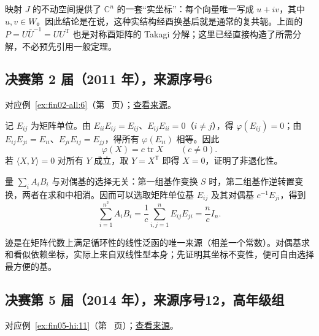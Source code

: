 \documentclass[UTF8,12pt,a4paper,fontset=fandol]{ctexart}
\begin{document}
\begin{remark}[方法与条件]

映射 $J$ 的不动空间提供了 $\mathbb C^n$ 的一套“实坐标”：每个向量唯一写成 $u+iv$，其中 $u,v\in W$。因此结论是在说，这种实结构经酉换基后就是通常的复共轭。上面的 $P=U\bar U^{-1}=UU^{\mathrm T}$ 也是对称酉矩阵的 Takagi 分解；这里已经直接构造了所需分解，不必预先引用一般定理。

\end{remark}

\subsection{决赛第 2 届（2011 年），来源序号6}\label{ans:fin02-all:6}\label{pr:fin02-all:6}

对应例~\ref{ex:fin02-all:6}（第~\pageref{ex:fin02-all:6} 页）；\href{https://github.com/lzxcr/cmc-mathematics/blob/64916fa1fdbc3e444a652eca204d5669058ee321/src/problems/finals/02/06.md}{查看来源}。

\begin{solve}

记 $E_{ij}$ 为矩阵单位。由
$E_{ii}E_{ij}=E_{ij}$、$E_{ij}E_{ii}=0$（$i\ne j$），得 $\varphi(E_{ij})=0$；由
$E_{ij}E_{ji}=E_{ii}$、$E_{ji}E_{ij}=E_{jj}$，得所有 $\varphi(E_{ii})$ 相等。因此
\[
\varphi(X)=c\operatorname{tr}X\qquad(c\ne0).
\]
若 $\langle X,Y\rangle=0$ 对所有 $Y$ 成立，取 $Y=X^{\mathsf T}$ 即得 $X=0$，证明了非退化性。

量 $\sum_iA_iB_i$ 与对偶基的选择无关：第一组基作变换 $S$ 时，第二组基作逆转置变换，两者在求和中相消。因而可以选取矩阵单位基 $E_{ij}$ 及其对偶基 $c^{-1}E_{ji}$，得到
\[
\sum_{i=1}^{n^2}A_iB_i
=\frac1c\sum_{i,j=1}^n E_{ij}E_{ji}
=\frac nc I_n.
\]

\end{solve}

\begin{remark}[方法与条件]

迹是在矩阵代数上满足循环性的线性泛函的唯一来源（相差一个常数）。对偶基求和看似依赖坐标，实际上来自双线性型本身；先证明其坐标不变性，便可自由选择最方便的基。

\end{remark}

\subsection{决赛第 5 届（2014 年），来源序号12，高年级组}\label{ans:fin05-hi:11}\label{pr:fin05-hi:11}

对应例~\ref{ex:fin05-hi:11}（第~\pageref{ex:fin05-hi:11} 页）；\href{https://github.com/lzxcr/cmc-mathematics/blob/64916fa1fdbc3e444a652eca204d5669058ee321/src/problems/finals/05/12.md}{查看来源}。
\end{document}

